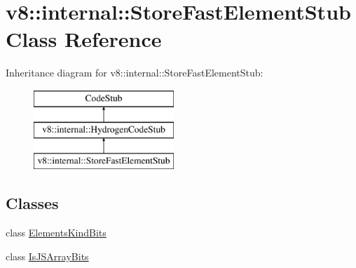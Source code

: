 \hypertarget{classv8_1_1internal_1_1_store_fast_element_stub}{}\section{v8\+:\+:internal\+:\+:Store\+Fast\+Element\+Stub Class Reference}
\label{classv8_1_1internal_1_1_store_fast_element_stub}
Inheritance diagram for v8\+:\+:internal\+:\+:Store\+Fast\+Element\+Stub\+:\begin{figure}[H]
\begin{center}
\leavevmode
\includegraphics[height=3.000000cm]{classv8_1_1internal_1_1_store_fast_element_stub}
\end{center}
\end{figure}
\subsection*{Classes}
\begin{DoxyCompactItemize}
\item 
class \hyperlink{classv8_1_1internal_1_1_store_fast_element_stub_1_1_elements_kind_bits}{Elements\+Kind\+Bits}
\item 
class \hyperlink{classv8_1_1internal_1_1_store_fast_element_stub_1_1_is_j_s_array_bits}{Is\+J\+S\+Array\+Bits}
\end{DoxyCompactItemize}
